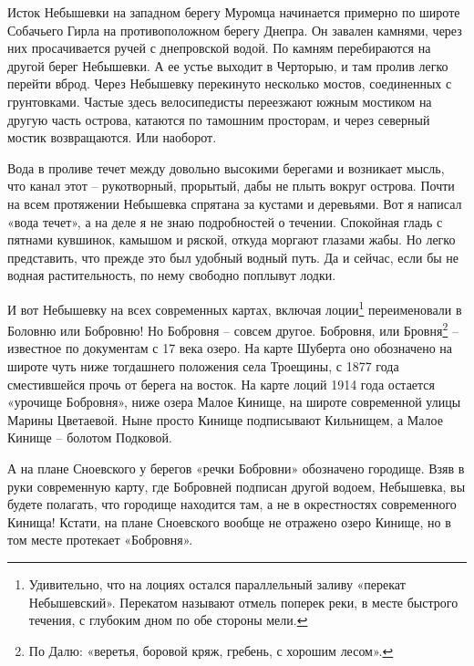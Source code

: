 Исток Небышевки на западном берегу Муромца начинается примерно по широте Собачьего Гирла на противоположном берегу Днепра. Он завален камнями, через них просачивается ручей с днепровской водой. По камням перебираются на другой берег Небышевки. А ее устье выходит в Черторыю, и там пролив легко перейти вброд. Через Небышевку перекинуто несколько мостов, соединенных с грунтовками. Частые здесь велосипедисты переезжают южным мостиком на другую часть острова, катаются по тамошним просторам, и через северный мостик возвращаются. Или наоборот.%

Вода в проливе течет между довольно высокими берегами и возникает мысль, что канал этот – рукотворный, прорытый, дабы не плыть вокруг острова. Почти на всем протяжении Небышевка спрятана за кустами и деревьями. Вот я написал «вода течет», а на деле я не знаю подробностей о течении. Спокойная гладь с пятнами кувшинок, камышом и ряской, откуда моргают глазами жабы. Но легко представить, что прежде это был удобный водный путь. Да и сейчас, если бы не водная растительность, по нему свободно поплывут лодки. 

И вот Небышевку на всех современных картах, включая лоции\footnote{Удивительно, что на лоциях остался параллельный заливу «перекат Небышевский». Перекатом называют отмель поперек реки, в месте быстрого течения, с глубоким дном по обе стороны мели.} переименовали в Боловню или Бобровню! Но Бобровня – совсем другое. Бобровня, или Бровня\footnote{По Далю: «веретья, боровой кряж, гребень, с хорошим лесом».} – известное по документам с 17 века озеро. На карте Шуберта оно обозначено на широте чуть ниже тогдашнего положения села Троещины, с 1877 года сместившейся прочь от берега на восток. На карте лоций 1914 года остается «урочище Бобровня», ниже озера Малое Кинище, на широте современной улицы Марины Цветаевой. Ныне просто Кинище подписывают Кильнищем, а Малое Кинище – болотом Подковой.

А на плане Сноевского у берегов «речки Бобровни» обозначено городище. Взяв в руки современную карту, где Бобровней подписан другой водоем, Небышевка, вы будете полагать, что городище находится там, а не в окрестностях современного Кинища! Кстати, на плане Сноевского вообще не отражено озеро Кинище, но в том месте протекает «Бобровня».

